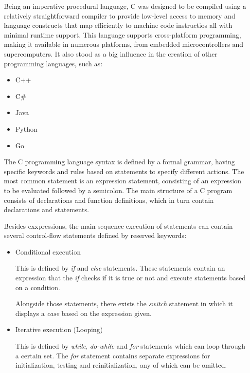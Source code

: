 \documentclass[12pt,a4paper,twoside]{report}
\begin{document}
 Being an imperative procedural language, C was designed to be compiled using a relatively straightforward compiler to provide low-level access to memory and language constructs that map efficiently to machine code instructios all with minimal runtime support. This language supports cross-platform programming, making it available in numerous platforms, from embedded microcontrollers and supercomputers. It also stood as a big influence in the creation of other programming languages, such as:
 \begin{itemize}
 	\item C++
 	\item C\#
 	\item Java
 	\item Python
 	\item Go
 \end{itemize}

 The C programming language syntax is defined by a formal grammar, having specific keywords and rules based on statements to specify different actions. The most common statement is an expression statement, consisting of an expression to be evaluated followed by a semicolon. The main structure of a C program consists of declarations and function definitions, which in turn contain declarations and statements. 
 
 Besides exxpressions, the main sequence execution of statements can contain several control-flow statements defined by reserved keywords:
  
 \begin{itemize}
 	\item Conditional execution 
 	
 		This is defined by \textit{if} and \textit{else} statements. These statements contain an expression that the \textit{if} checks if it is true or not and execute statements based on a condition.
 		
 		Alongside those statements, there exists the \textit{switch} statement in which it displays a \textit{case} based on the expression given.
 		
 	\item Iterative execution (Looping)
 	
 		This is defined by \textit{while}, \textit{do-while} and \textit{for} statements which can loop through a certain set. The \textit{for} statement contains separate expressions for initialization, testing and reinitialization, any of which can be omitted. 
 \end{itemize}
\end{document}
